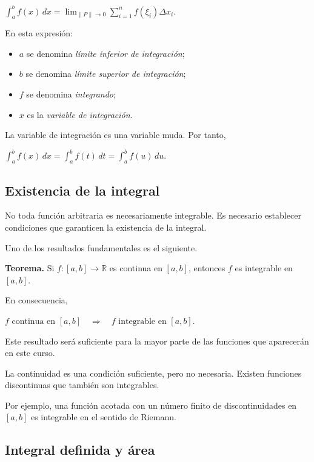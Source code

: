 \documentclass[12pt]{article}
\begin{document}
$
\boxed{
\int_a^b f(x)\,dx
=
\lim_{\|P\|\to0}
\sum_{i=1}^{n}f(\xi_i)\Delta x_i.
}
$

En esta expresión:

\begin{itemize}
    \item $a$ se denomina \emph{límite inferior de integración};
    \item $b$ se denomina \emph{límite superior de integración};
    \item $f$ se denomina \emph{integrando};
    \item $x$ es la \emph{variable de integración}.
\end{itemize}

La variable de integración es una variable muda. Por tanto,

$
\int_a^b f(x)\,dx
=
\int_a^b f(t)\,dt
=
\int_a^b f(u)\,du.
$

\subsection*{Existencia de la integral}

No toda función arbitraria es necesariamente integrable. Es necesario
establecer condiciones que garanticen la existencia de la integral.

Uno de los resultados fundamentales es el siguiente.

\textbf{Teorema.}
Si
$
f:[a,b]\longrightarrow\mathbb{R}
$
es continua en $[a,b]$, entonces $f$ es integrable en $[a,b]$.

En consecuencia,

$
\boxed{
f\text{ continua en }[a,b]
\quad\Longrightarrow\quad
f\text{ integrable en }[a,b].
}
$

Este resultado será suficiente para la mayor parte de las funciones que
aparecerán en este curso.

La continuidad es una condición suficiente, pero no necesaria. Existen
funciones discontinuas que también son integrables.

Por ejemplo, una función acotada con un número finito de discontinuidades
en $[a,b]$ es integrable en el sentido de Riemann.

\subsection*{Integral definida y área}
\end{document}
